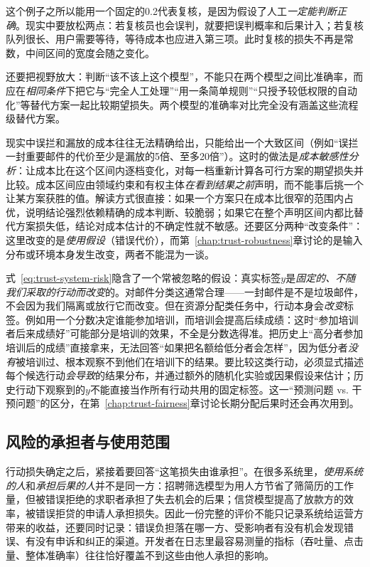 这个例子之所以能用一个固定的0.2代表复核，是因为假设了人工\emph{一定能判断正确}。现实中要放松两点：若复核员也会误判，就要把误判概率和后果计入；若复核队列很长、用户需要等待，等待成本也应进入第三项。此时复核的损失不再是常数，中间区间的宽度会随之变化。

还要把视野放大：判断“该不该上这个模型”，不能只在两个模型之间比准确率，而应在\emph{相同条件}下把它与“完全人工处理”“用一条简单规则”“只授予较低权限的自动化”等替代方案一起比较期望损失。两个模型的准确率对比完全没有涵盖这些流程级替代方案。

现实中误拦和漏放的成本往往无法精确给出，只能给出一个大致区间（例如“误拦一封重要邮件的代价至少是漏放的5倍、至多20倍”）。这时的做法是\emph{成本敏感性分析}：让成本比在这个区间内逐档变化，对每一档重新计算各可行方案的期望损失并比较。成本区间应由领域约束和有权主体\emph{在看到结果之前}声明，而不能事后挑一个让某方案获胜的值。解读方式很直接：如果一个方案只在成本比很窄的范围内占优，说明结论强烈依赖精确的成本判断、较脆弱；如果它在整个声明区间内都比替代方案损失低，结论对成本估计的不确定性就不敏感。还要区分两种“改变条件”：这里改变的是\emph{使用假设}（错误代价），而第~\ref{chap:trust-robustness}章讨论的是输入分布或环境本身发生改变，两者不能混为一谈。

式~\eqref{eq:trust-system-risk}隐含了一个常被忽略的假设：真实标签$y$是\emph{固定的、不随我们采取的行动而改变}的。对邮件分类这通常合理——一封邮件是不是垃圾邮件，不会因为我们隔离或放行它而改变。但在资源分配类任务中，行动本身会\emph{改变}标签。例如用一个分数决定谁能参加培训，而培训会提高后续成绩：这时“参加培训者后来成绩好”可能部分是培训的效果，不全是分数选得准。把历史上“高分者参加培训后的成绩”直接拿来，无法回答“如果把名额给低分者会怎样”，因为低分者\emph{没有}被培训过、根本观察不到他们在培训下的结果。要比较这类行动，必须显式描述每个候选行动\emph{会导致}的结果分布，并通过额外的随机化实验或因果假设来估计；历史行动下观察到的$y$不能直接当作所有行动共用的固定标签。这一“预测问题 vs. 干预问题”的区分，在第~\ref{chap:trust-fairness}章讨论长期分配后果时还会再次用到。

\subsection{风险的承担者与使用范围}

行动损失确定之后，紧接着要回答“这笔损失由谁承担”。在很多系统里，\emph{使用系统的人}和\emph{承担后果的人}并不是同一方：招聘筛选模型为用人方节省了筛简历的工作量，但被错误拒绝的求职者承担了失去机会的后果；信贷模型提高了放款方的效率，被错误拒贷的申请人承担损失。因此一份完整的评价不能只记录系统给运营方带来的收益，还要同时记录：错误负担落在哪一方、受影响者有没有机会发现错误、有没有申诉和纠正的渠道。开发者在日志里最容易测量的指标（吞吐量、点击量、整体准确率）往往恰好覆盖不到这些由他人承担的影响。

